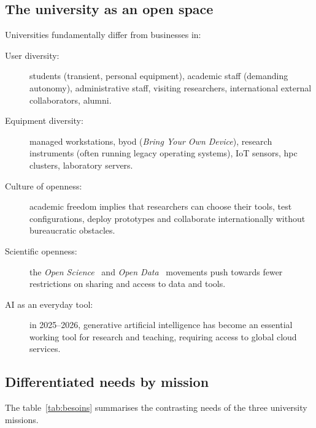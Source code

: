 \subsection{The university as an open space}

Universities fundamentally differ from businesses in:

\begin{description}
    \item[User diversity:] students (transient,
    personal equipment), academic staff (demanding autonomy),
    administrative staff, visiting researchers, international external
    collaborators, alumni.
    \item[Equipment diversity:] managed workstations, \gls{byod}
    (\emph{Bring Your Own Device}), research instruments (often running
    legacy operating systems), IoT sensors, \gls{hpc} clusters, laboratory
    servers.
    \item[Culture of openness:] academic freedom implies that
    researchers can choose their tools, test configurations,
    deploy prototypes and collaborate internationally without
    bureaucratic obstacles.
    \item[Scientific openness:] the \emph{Open Science}~\cite{unesco-open-science,
    open_knowledge_foundation_open_2015, berners-lee_linked_2006} and
    \emph{Open Data}~\cite{fair2016} movements push towards fewer
    restrictions on sharing and access to data and tools.
    \item[AI as an everyday tool:] in 2025--2026, generative
    artificial intelligence has become an essential working tool
    for research and teaching, requiring access to
    global cloud services.
\end{description}

\subsection{Differentiated needs by mission}

The table~\ref{tab:besoins} summarises the contrasting needs of the three
university missions.

